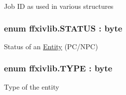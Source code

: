 Job I\-D as used in various structures 

\hypertarget{namespaceffxivlib_a856915176aeab1f9b643c0243cb008ee}{
\subsubsection[{S\-T\-A\-T\-U\-S}]{\setlength{\rightskip}{0pt plus 5cm}enum {\bf ffxivlib.\-S\-T\-A\-T\-U\-S} \-: byte}}\label{namespaceffxivlib_a856915176aeab1f9b643c0243cb008ee}


Status of an \hyperlink{classffxivlib_1_1_entity}{Entity} (P\-C/\-N\-P\-C) 

\hypertarget{namespaceffxivlib_aaa4e86d1ea6dbc1661147e6616256e68}{
\subsubsection[{T\-Y\-P\-E}]{\setlength{\rightskip}{0pt plus 5cm}enum {\bf ffxivlib.\-T\-Y\-P\-E} \-: byte}}\label{namespaceffxivlib_aaa4e86d1ea6dbc1661147e6616256e68}


Type of the entity 

